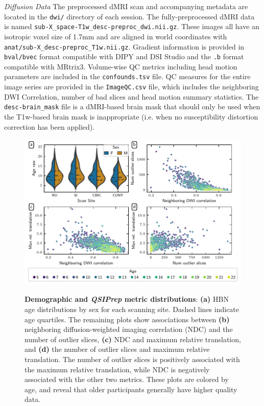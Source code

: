 \documentclass[9pt,lineno]{elife}
\begin{document}
\emph{Diffusion Data} The preprocessed dMRI scan and accompanying metadata are located in the 
\texttt{dwi/} directory of each session. The fully-preprocessed dMRI data is named 
\texttt{sub-X\_space-T1w\_desc-preproc\_dwi.nii.gz}. These images all have an isotropic voxel
size of 1.7mm and are aligned in world coordinates with \texttt{anat/sub-X\_desc-preproc\_T1w.nii.gz}.
Gradient information is provided in \texttt{bval/bvec} format compatible with DIPY and DSI Studio and
the \texttt{.b} format compatible with MRtrix3. Volume-wise QC metrics including head motion parameters
are included in the \texttt{confounds.tsv} file. QC measures for the entire image series are provided
in the \texttt{ImageQC.csv} file, which includes the neighboring DWI Correlation, number of bad slices
and head motion summary statistics. The \texttt{desc-brain\_mask} file is a dMRI-based brain mask that
should only be used when the T1w-based brain mask is inappropriate (i.e. when no susceptibility distortion
correction has been applied).

\begin{figure}[tbp]
    {\label{fig:metric-dist:age}}
    {\label{fig:metric-dist:ndc-slices}}
    {\label{fig:metric-dist:ndc-translation}}
    {\label{fig:metric-dist:slices-translation}}
    \centering
    \includegraphics[width=\linewidth]{bundle-profiles/qsiprep-metric-distributions.pdf}
    \caption{%
        {\bf Demographic and \emph{QSIPrep} metric distributions}:
        \textbf{(a)} HBN age distributions by sex for each scanning site. Dashed lines
        indicate age quartiles.
        The remaining plots show associations between \textbf{(b)} neighboring
        diffusion-weighted imaging correlation (NDC) \citep{yeh2019-kb} and the
        number of outlier slices, \textbf{(c)} NDC and maximum relative
        translation, and \textbf{(d)} the number of outlier slices and maximum
        relative translation.
        The number of outlier slices is positively associated with the maximum
        relative translation, while NDC is negatively associated with the other
        two metrics.
        These plots are colored by age, and reveal that older participants
        generally have higher quality data.
    }
    \label{fig:metric-dist}
\end{figure}
\end{document}
